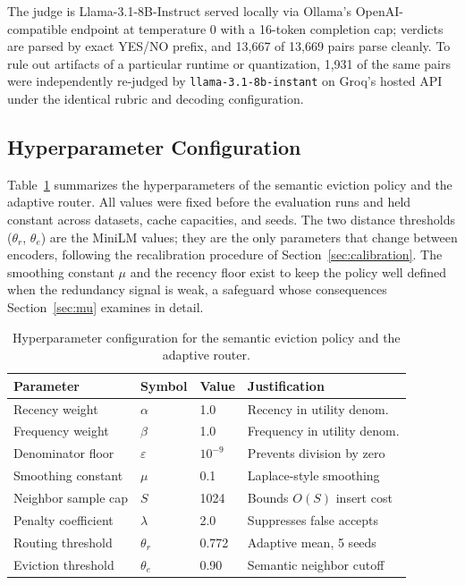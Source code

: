 \documentclass[sigconf,nonacm]{acmart}
\begin{document}
The judge is Llama-3.1-8B-Instruct \cite{grattafiori2024llama} served
locally via Ollama's OpenAI-compatible endpoint at temperature 0 with
a 16-token completion cap; verdicts are parsed by exact YES/NO prefix,
and 13{,}667 of 13{,}669 pairs parse cleanly. To rule out artifacts of
a particular runtime or quantization, 1{,}931 of the same pairs were
independently re-judged by \texttt{llama-3.1-8b-instant} on Groq's
hosted API under the identical rubric and decoding configuration.

\subsection{Hyperparameter Configuration}
Table~\ref{tab:hyperparams} summarizes the hyperparameters of the semantic eviction policy and the adaptive router. All values were fixed before the evaluation runs and held constant across datasets, cache capacities, and seeds. The two distance thresholds ($\theta_r$, $\theta_e$) are the MiniLM values; they are the only parameters that change between encoders, following the recalibration procedure of Section~\ref{sec:calibration}. The smoothing constant $\mu$ and the recency floor exist to keep the policy well defined when the redundancy signal is weak, a safeguard whose consequences Section~\ref{sec:mu} examines in detail.

\begin{table}[h]
\caption{Hyperparameter configuration for the semantic
eviction policy and the adaptive router.}
\label{tab:hyperparams}
\small
\begin{tabular}{@{}lllp{2.6cm}@{}}
\toprule
Parameter & Symbol & Value & Justification \\
\midrule
Recency weight      & $\alpha$      & 1.0        & Recency in utility denom. \\
Frequency weight    & $\beta$       & 1.0        & Frequency in utility denom. \\
Denominator floor   & $\varepsilon$ & $10^{-9}$  & Prevents division by zero \\
Smoothing constant  & $\mu$         & 0.1        & Laplace-style smoothing \\
Neighbor sample cap & $S$           & 1024       & Bounds $O(S)$ insert cost \\
Penalty coefficient & $\lambda$     & 2.0        & Suppresses false accepts \\
Routing threshold   & $\theta_r$    & 0.772      & Adaptive mean, 5 seeds \\
Eviction threshold  & $\theta_e$    & 0.90       & Semantic neighbor cutoff \\
\bottomrule
\end{tabular}
\end{table}
\end{document}
